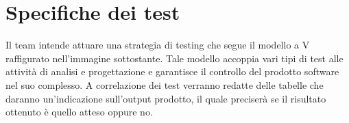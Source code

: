 \section{Specifiche dei test}
Il team intende attuare una strategia di testing che segue il modello a V raffigurato nell'immagine sottostante. Tale modello accoppia vari tipi di test alle attività di analisi e progettazione e garantisce il controllo del prodotto software nel suo complesso. A correlazione dei test verranno redatte delle tabelle che daranno un'indicazione sull'output prodotto, il quale preciserà se il risultato ottenuto è quello atteso oppure no.

